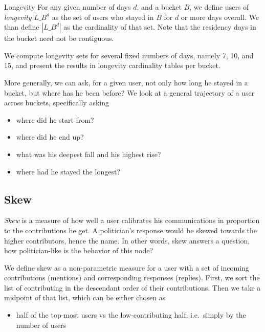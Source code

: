 \documentclass[10pt,oneside]{memoir}
\begin{document}
\begin{Spacing}{2}
Longevity
For any given number of days $d$, and a bucket $B$, we define users of {\itshape longevity} $L\_B^d$ as the set of users who stayed in $B$ for $d$ or more days overall.  We than define $|L\_B^d|$ as the cardinality of that set.  Note that the residency days in the bucket need not be contiguous.


We compute longevity sets for several fixed numbers of days, namely 7, 10, and 15, and  present the results in longevity cardinality tables per bucket.


More generally, we can ask, for a given user, not only how long he stayed in a bucket, but where has he been before?  We look at a general trajectory of a user across buckets, specifically asking


\begin{itemize}


\item where did he start from?

\item where did he end up?

\item what was his deepest fall and his highest rise?

\item where had he stayed the longest?
\end{itemize}

\pagebreak \subsection{Skew}
\label{skew}

{\itshape Skew} is a measure of how well a user calibrates his communications in proportion to the contributions he get.  A politician's response would be skewed towards the higher contributors, hence the name.  In other words, skew answers a question, how politician-like is the behavior of this node?


We define skew as a non-parametric measure for a user with a set of incoming contributions (mentions) and corresponding responses (replies).  First, we sort the list of contributing in the descendant order of their contributions.  Then we take a midpoint of that list, which can be either chosen as


\begin{itemize}


\item half of the top-most users vs the low-contributing half, i.e.\ simply by the number of users


\end{itemize}
\end{Spacing}
\end{document}
